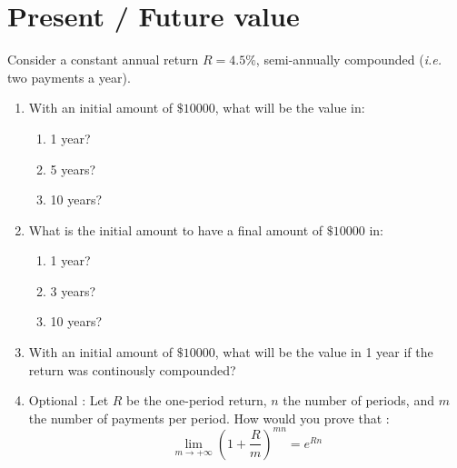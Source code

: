 \section{Present / Future value}

Consider a constant annual return $R = 4.5\%$, semi-annually compounded (\textit{i.e.} two payments a year). 

\begin{enumerate}
    \item With an initial amount of $\$10000 $, what will be the value in:
    \begin{enumerate}
        \item 1 year?
        \item 5 years?
        \item 10 years?
    \end{enumerate}
    \item What is the initial amount to have a final amount of $\$10000$ in:
    \begin{enumerate}
        \item 1 year?
        \item 3 years?
        \item 10 years?
    \end{enumerate}
    \item With an initial amount of $\$10000$, what will be the value in 1 year if the return was continously compounded?
    \item Optional : Let $R$ be the one-period return, $n$ the number of periods, and $m$ the number of payments per period. How would you prove that : \[ \lim_{m\to+\infty} (1 + \frac{R}{m})^{mn} = e^{Rn} \]
\end{enumerate}




